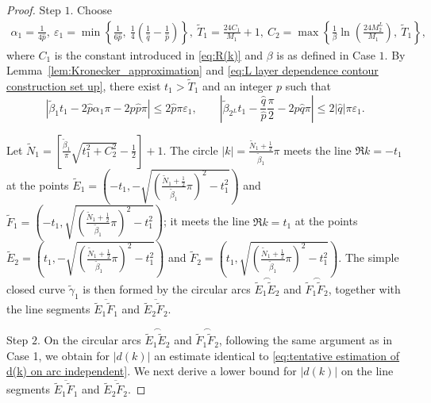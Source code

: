 \documentclass[11pt,reqno]{amsart}
\theoremstyle{definition}
\theoremstyle{remark}
\numberwithin{equation}{section}
\begin{document}
\begin{proof}
Step $1$. Choose  
\begin{equation}\label{eq:L layer dependence contour construction set up}
    \begin{aligned}
        \alpha_1=\frac{1}{4\hat{p}},~\varepsilon_1=\min\left\{\frac{1}{6\hat{p}},~\frac{1}{4}\left(\frac{1}{\hat{q}}-\frac{1}{\hat{p}}\right)\right\},~\widetilde{T}_1=\frac{24C_1}{M_1}+1,~C_2=\max\left\{\frac{1}{\beta}\ln\left(\frac{24M_2^L}{M_1}\right),~\widetilde{T}_1\right\},~
    \end{aligned}
\end{equation}
where $C_1$ is the constant introduced in \eqref{eq:R(k)} and $\beta$ is as defined in Case $1$. By Lemma~\ref{lem:Kronecker_approximation} and \eqref{eq:L layer dependence contour construction set up}, there exist $t_1>\widetilde{T}_1$ and an integer $p$ such that  
\begin{equation}\label{eq:L layer dependence subcase b Kronecker inequality}
\left|\tilde{\beta}_1t_1-2\hat{p}\alpha_1\pi-2p\hat{p}\pi\right|\leq 2\hat{p}\pi\varepsilon_1,\qquad
\left|\tilde{\beta}_{2^L}t_1-\frac{\hat{q}}{\hat{p}}\frac{\pi}{2}-2p\hat{q}\pi\right|\leq 2|\hat{q}|\pi\varepsilon_1.~
\end{equation}

Let $\widetilde{N}_1=\left[\frac{\tilde{\beta}_1}{\pi}\sqrt{t_1^2+C_2^2}-\frac{1}{2}\right]+1$. The circle $|k|=\frac{\widetilde{N}_1+\frac{1}{2}}{\tilde{\beta}_1}\pi$ meets the line $\Re k=-t_1$ at the points $\tilde{E}_1=\left(-t_1,-\sqrt{\left(\frac{\widetilde{N}_1+\frac{1}{2}}{\tilde{\beta}_1}\pi\right)^2-t_1^2}\right)$ and $\tilde{F}_1=\left(-t_1,\sqrt{\left(\frac{\widetilde{N}_1+\frac{1}{2}}{\tilde{\beta}_1}\pi\right)^2-t_1^2}\right)$; it meets the line $\Re k=t_1$ at the points $\tilde{E}_2=\left(t_1,-\sqrt{\left(\frac{\widetilde{N}_1+\frac{1}{2}}{\tilde{\beta}_1}\pi\right)^2-t_1^2}\right)$ and $\tilde{F}_2=\left(t_1,\sqrt{\left(\frac{\widetilde{N}_1+\frac{1}{2}}{\tilde{\beta}_1}\pi\right)^2-t_1^2}\right)$. The simple closed curve $\widetilde{\gamma}_1$ is then formed by the circular arcs $\overset{\frown}{\widetilde{E}_1\widetilde{E}_2}$ and $\overset{\frown}{\widetilde{F}_1\widetilde{F}_2}$, together with the line segments $\overline{\widetilde{E}_1\widetilde{F}_1}$ and $\overline{\widetilde{E}_2\widetilde{F}_2}$.  
 
   
Step $2$. On the circular arcs $\overset{\frown}{\widetilde{E}_1\widetilde{E}_2}$ and $\overset{\frown}{\widetilde{F}_1\widetilde{F}_2}$, following the same argument as in Case 1, we obtain for $|d(k)|$ an estimate identical to \eqref{eq:tentative estimation of d(k) on arc independent}. We next derive a lower bound for $|d(k)|$ on the line segments $\overline{\widetilde{E}_1\widetilde{F}_1}$ and $\overline{\widetilde{E}_2\widetilde{F}_2}$.


\end{proof}
\end{document}
